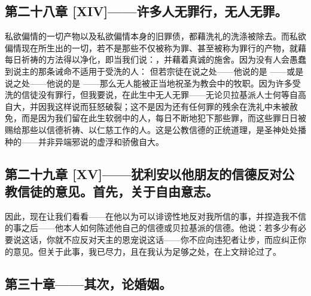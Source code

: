 
\subsection{第二十八章 [XIV]——许多人无罪行，无人无罪。}

私欲偏情的一切产物以及私欲偏情本身的旧罪债，都藉洗礼的洗涤被除去。而私欲偏情现在所生出的一切，若不是那些不仅被称为罪、甚至被称为罪行的产物，就藉每日祈祷的方法得以净化，即当我们说：，并藉着真诚的施舍。因为没有人会愚蠢到说主的那条诫命不适用于受洗的人：  但若宗徒在说之处——他说的是 ——或是说之处——他说的是 ——那么无人能被正当地祝圣为教会中的牧职。因为许多受洗的信徒没有罪行，但我要说，在此生中无人无罪——无论贝拉基派人士何等自高自大，并因我这样说而狂怒破裂；这不是因为还有任何罪的残余在洗礼中未被赦免，而是因为我们留在此生软弱中的人，每日不断地犯下那些罪，而这些罪日日被赐给那些以信德祈祷、以仁慈工作的人。这是公教信德的正统道理，是圣神处处播种的——并非异端邪说的虚浮和骄傲自大。\par


\subsection{第二十九章 [XV]——犹利安以他朋友的信德反对公教信徒的意见。首先，关于自由意志。}

因此，现在让我们看看——在他以为可以诽谤性地反对我所信的事，并捏造我不信的事之后——他本人如何陈述他自己的信德或贝拉基派的信德。他说：若多少有必要说这话，你就不应反对天主的恩宠说这话——你不应向违犯者让步，而应纠正你的意见。但关于此事，我已尽力，且在我认为足够之处，在上文辩论过了。\par


\subsection{第三十章——其次，论婚姻。}

